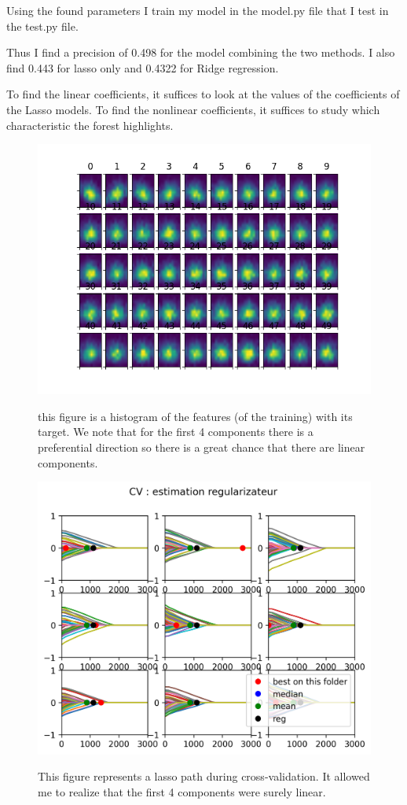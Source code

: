 \documentclass{article}
\begin{document}
Using the found parameters I train my model in the model.py file that I test in the test.py file.

Thus I find a precision of 0.498 for the model combining the two methods.
I also find 0.443 for lasso only and 0.4322 for Ridge regression.

To find the linear coefficients, it suffices to look at the values ​​of the coefficients of the Lasso models. To find the nonlinear coefficients, it suffices to study which characteristic the forest highlights.




\begin{figure}
\includegraphics[scale=1]{visu_feature.png}

this figure is a histogram of the features (of the training) with its target.
We note that for the first 4 components there is a preferential direction so there is a great chance that there are linear components.
\end{figure}

\clearpage
\begin{figure}
\includegraphics[scale=1]{cv_reg.png}

This figure represents a lasso path during cross-validation.
It allowed me to realize that the first 4 components were surely linear.
\end{figure}
\clearpage
\end{document}
